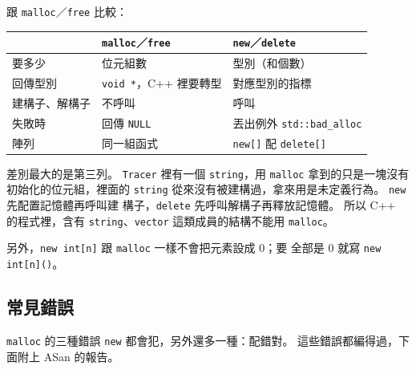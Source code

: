 
跟 \texttt{malloc}／\texttt{free} 比較：

\begin{center}
\begin{tabular}{lll}
\toprule
 & \texttt{malloc}／\texttt{free} & \texttt{new}／\texttt{delete} \\
\midrule
要多少 & 位元組數 & 型別（和個數） \\
回傳型別 & \texttt{void *}，C++ 裡要轉型 & 對應型別的指標 \\
建構子、解構子 & 不呼叫 & 呼叫 \\
失敗時 & 回傳 \texttt{NULL} & 丟出例外 \texttt{std::bad\_alloc} \\
陣列 & 同一組函式 & \texttt{new[]} 配 \texttt{delete[]} \\
\bottomrule
\end{tabular}
\end{center}

差別最大的是第三列。 \texttt{Tracer} 裡有一個 \texttt{string}，用
\texttt{malloc} 拿到的只是一塊沒有初始化的位元組，裡面的 \texttt{string}
從來沒有被建構過，拿來用是未定義行為。 \texttt{new} 先配置記憶體再呼叫建
構子，\texttt{delete} 先呼叫解構子再釋放記憶體。 所以
C++ 的程式裡，含有 \texttt{string}、\texttt{vector} 這類成員的結構不能用
\texttt{malloc}。

另外，\texttt{new int[n]} 跟 \texttt{malloc} 一樣不會把元素設成 $0$；要
全部是 $0$ 就寫 \texttt{new int[n]()}。

\subsection{常見錯誤}

\texttt{malloc} 的三種錯誤 \texttt{new} 都會犯，另外還多一種：配錯對。
這些錯誤都編得過，下面附上 ASan 的報告。

